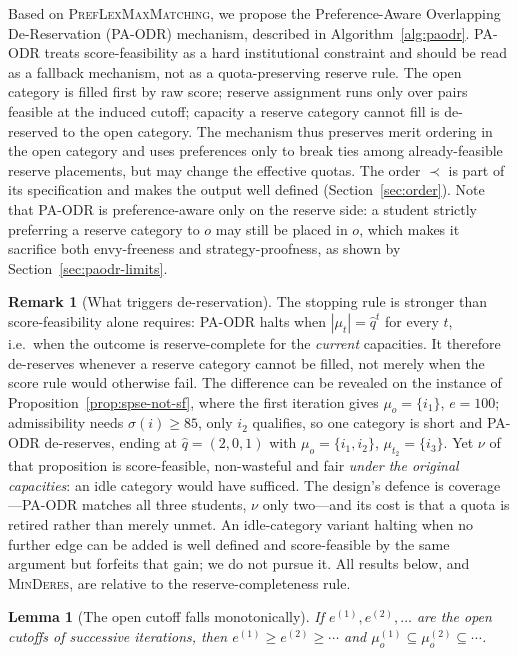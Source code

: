 \documentclass[a4paper,twoside]{article}
\newtheorem{lemma}{Lemma}
\theoremstyle{definition}
\newtheorem{nremark}{Remark}
\begin{document}
Based on \textsc{PrefLexMaxMatching}, we propose the Preference-Aware Overlapping De-Reservation (PA-ODR) mechanism, described in Algorithm~\ref{alg:paodr}. PA-ODR treats score-feasibility as a hard institutional constraint and should be read as a fallback mechanism, not as a quota-preserving reserve rule. The open category is filled first by raw score; reserve assignment runs only over pairs feasible at the induced cutoff; capacity a reserve category cannot fill is de-reserved to the open category. The mechanism thus preserves merit ordering in the open category and uses preferences only to break ties among already-feasible reserve placements, but may change the effective quotas. The order $\prec$ is part of its specification and makes the output well defined (Section~\ref{sec:order}). Note that PA-ODR is preference-aware only on the reserve side: a student strictly preferring a reserve category to $o$ may still be placed in $o$, which makes it sacrifice both envy-freeness and strategy-proofness, as shown by Section~\ref{sec:paodr-limits}.

\begin{nremark}[What triggers de-reservation]
\label{sec:trigger}
The stopping rule is stronger than score-feasibility alone requires: PA-ODR halts when $|\mu_t|=\hat q^t$ for every $t$, i.e.\ when the outcome is reserve-complete for the \emph{current} capacities. It therefore de-reserves whenever a reserve category cannot be filled, not merely when the score rule would otherwise fail. The difference can be revealed on the instance of Proposition~\ref{prop:spse-not-sf}, where the first iteration gives $\mu_o=\{i_1\}$, $e=100$; admissibility needs $\sigma(i)\ge85$, only $i_2$ qualifies, so one category is short and PA-ODR de-reserves, ending at $\hat q=(2,0,1)$ with $\mu_o=\{i_1,i_2\}$, $\mu_{t_2}=\{i_3\}$. Yet $\nu$ of that proposition is score-feasible, non-wasteful and fair \emph{under the original capacities}: an idle category would have sufficed. The design's defence is coverage---PA-ODR matches all three students, $\nu$ only two---and its cost is that a quota is retired rather than merely unmet. An idle-category variant halting when no further edge can be added is well defined and score-feasible by the same argument but forfeits that gain; we do not pursue it. All results below, and \textsc{MinDeres}, are relative to the reserve-completeness rule.
\end{nremark}

\begin{lemma}[The open cutoff falls monotonically]
\label{lem:monotone}
If $e^{(1)},e^{(2)},\dots$ are the open cutoffs of successive iterations, then $e^{(1)}\ge e^{(2)}\ge\cdots$ and $\mu_o^{(1)}\subseteq\mu_o^{(2)}\subseteq\cdots$.
\end{lemma}
\end{document}
